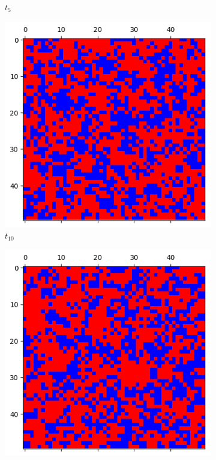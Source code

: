\documentclass[letterpaper]{article}
\begin{document}
\begin{figure}
\begin{subfigure}{.3\textwidth}
      \caption{$t_5$}
      \label{fig:t5_50part2}
    \end{subfigure}
    \begin{subfigure}{.3\textwidth}
      \centering
      \includegraphics[width=1\linewidth]{images/assign2/visu_50-part2/t10}
      \caption{$t_{10}$}
      \label{fig:t10_50part2}
    \end{subfigure}
    \begin{subfigure}{.3\textwidth}
      \centering
      \includegraphics[width=1\linewidth]{images/assign2/visu_50-part2/t20}

\end{subfigure}
\end{figure}
\end{document}
